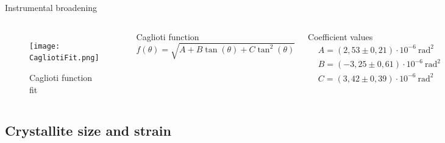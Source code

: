 \documentclass{beamer}
\begin{document}
\begin{frame}{Instrumental broadening}
    \begin{columns}
        \begin{figure}
            \centering
            \texttt{[image: CagliotiFit.png]}
            \caption{Caglioti function fit}
            \label{fig:CagliotiFunctionFit}
        \end{figure}
        \begin{exampleblock}{Caglioti function}
            \begin{equation*}
                f(\theta) = \sqrt{A + B\tan(\theta) + C\tan^2(\theta)}
            \end{equation*}
        \end{exampleblock}
        \begin{block}{Coefficient values}
                \begin{align*}
                    &A = ( 2,53\pm 0,21 ) \cdot 10^{-6} \ \text{rad}^2 \\
                    &B = (-3,25 \pm 0,61 ) \cdot 10^{-6} \ \text{rad}^2 \\
                    &C = ( 3,42 \pm 0,39 ) \cdot 10^{-6} \ \text{rad}^2
                \end{align*}
        \end{block}
    \end{columns}
\end{frame}

\subsection{Crystallite size and strain}
\end{document}
